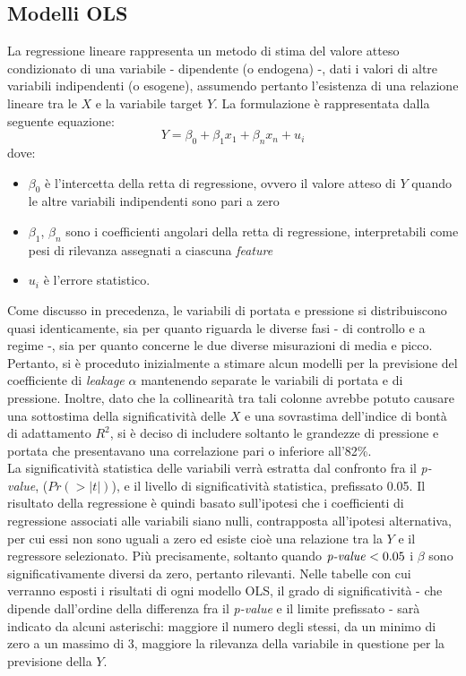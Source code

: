 \documentclass[fleqn,10pt]{SelfArx} %
\begin{document}
\subsection{Modelli OLS}
La regressione lineare rappresenta un metodo di stima del valore atteso condizionato di una variabile - dipendente (o endogena) -, dati i valori di altre variabili indipendenti (o esogene), assumendo pertanto l'esistenza di una relazione lineare tra le $X$ e
la variabile target $Y$. La formulazione è rappresentata dalla seguente equazione:
\begin{equation}\label{eq}
    Y = \beta_{0} + \beta_{1}x_{1} + \beta_{n}x_{n} + u_{i}
\end{equation}
dove:
\begin{itemize}
    \item $\beta_{0}$ è l'intercetta della retta di regressione, ovvero il valore atteso di $Y$ quando le altre variabili indipendenti sono pari a zero
    \item $\beta_{1}$, $\beta_{n}$ sono i coefficienti angolari della retta di regressione, interpretabili come pesi di rilevanza assegnati a ciascuna \textit{feature}
    \item $u_{i}$ è l'errore statistico.
\end{itemize}
Come discusso in precedenza, le variabili di portata e pressione si distribuiscono quasi identicamente, sia per quanto riguarda le diverse fasi - di controllo e a regime -, sia per quanto concerne le due diverse misurazioni di media e picco. Pertanto, si è proceduto inizialmente a stimare alcun modelli per la previsione del coefficiente di \textit{leakage} $\alpha$ mantenendo separate le variabili di portata e di pressione. Inoltre, dato che la collinearità tra tali colonne avrebbe potuto causare una sottostima della significatività delle $X$ e una sovrastima dell'indice di bontà di adattamento $R^2$, si è deciso di includere soltanto le grandezze di pressione e portata che presentavano una correlazione pari o inferiore all'82\%.\\
La significatività statistica delle variabili verrà estratta dal confronto fra il \textit{p-value}, ($Pr(>|t|)$), e il livello di significatività statistica, prefissato 0.05. Il risultato della regressione è quindi basato sull’ipotesi che i coefficienti di regressione associati alle variabili siano nulli, contrapposta all'ipotesi alternativa, per cui essi non sono uguali a zero ed esiste cioè una relazione tra la $Y$ e il regressore selezionato. Più precisamente, soltanto quando $\text{\textit{p-value}} < 0.05$ i $\beta$ sono significativamente diversi da zero, pertanto rilevanti. Nelle tabelle con cui verranno esposti i risultati di ogni modello OLS, il grado di significatività - che dipende dall'ordine della differenza fra il \textit{p-value} e il limite prefissato - sarà indicato da alcuni asterischi: maggiore il numero degli stessi, da un minimo di zero a un massimo di 3, maggiore la rilevanza della variabile in questione per la previsione della $Y$.\\
\end{document}
